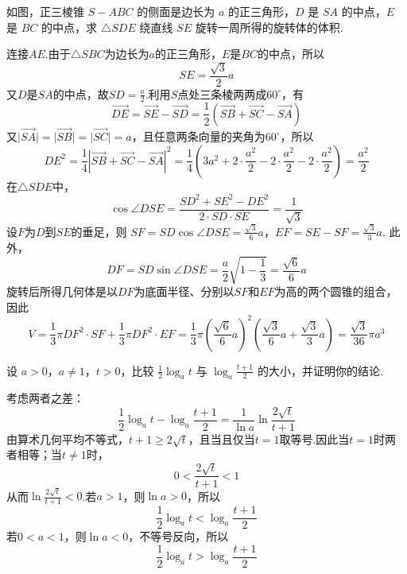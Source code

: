 \begin{problem}

如图，正三棱锥 \(S-ABC\) 的侧面是边长为 \(a\) 的正三角形，\(D\) 是 \(SA\) 的中点，\(E\) 是 \(BC\) 的中点，求 \(\triangle SDE\) 绕直线 \(SE\) 旋转一周所得的旋转体的体积.
\end{problem}

\begin{solution}
连接\(AE\).由于\(\triangle SBC\)为边长为\(a\)的正三角形，\(E\)是\(BC\)的中点，所以
\[
SE=\frac{\sqrt3}{2}a
\]
又\(D\)是\(SA\)的中点，故\(SD=\frac a2\).利用\(S\)点处三条棱两两成\(60^{\circ}\)，有
\[
\overrightarrow{DE}=\overrightarrow{SE}-\overrightarrow{SD}
=\frac12\left(\overrightarrow{SB}+\overrightarrow{SC}-\overrightarrow{SA}\right)
\]
又\(\lvert\overrightarrow{SA}\rvert=\lvert\overrightarrow{SB}\rvert=\lvert\overrightarrow{SC}\rvert=a\)，且任意两条向量的夹角为\(60^{\circ}\)，所以
\[
DE^2=\frac14\left\lvert\overrightarrow{SB}+\overrightarrow{SC}-\overrightarrow{SA}\right\rvert^2
=\frac14\left(3a^2+2\cdot\frac{a^2}{2}-2\cdot\frac{a^2}{2}-2\cdot\frac{a^2}{2}\right)
=\frac{a^2}{2}
\]
在\(\triangle SDE\)中，
\[
\cos\angle DSE
=\frac{SD^2+SE^2-DE^2}{2\cdot SD\cdot SE}
=\frac{1}{\sqrt3}
\]
设\(F\)为\(D\)到\(SE\)的垂足，则
\(SF=SD\cos\angle DSE=\frac{\sqrt3}{6}a\)，\(EF=SE-SF=\frac{\sqrt3}{3}a\).
此外，
\[
DF=SD\sin\angle DSE
=\frac a2\sqrt{1-\frac13}=\frac{\sqrt6}{6}a
\]
旋转后所得几何体是以\(DF\)为底面半径、分别以\(SF\)和\(EF\)为高的两个圆锥的组合，因此
\[
V=\frac13\pi DF^2\cdot SF+\frac13\pi DF^2\cdot EF
=\frac13\pi\left(\frac{\sqrt6}{6}a\right)^2
\left(\frac{\sqrt3}{6}a+\frac{\sqrt3}{3}a\right)
=\frac{\sqrt3}{36}\pi a^3
\]
\end{solution}

\begin{problem}

设 \(a > 0\)，\(a \neq 1\)，\(t > 0\)，比较 \(\frac{1}{2} \log_a t\) 与 \(\log_a \frac{t + 1}{2}\) 的大小，并证明你的结论.
\end{problem}

\begin{solution}
考虑两者之差：
\[
\frac12\log_a t-\log_a\frac{t+1}{2}
=\frac{1}{\ln a}\ln\frac{2\sqrt t}{t+1}
\]
由算术几何平均不等式，\(t+1\ge2\sqrt t\)，且当且仅当\(t=1\)取等号.因此当\(t=1\)时两者相等；当\(t\ne1\)时，
\[
0<\frac{2\sqrt t}{t+1}<1
\]
从而\(\ln\frac{2\sqrt t}{t+1}<0\).若\(a>1\)，则\(\ln a>0\)，所以
\[
\frac12\log_a t<\log_a\frac{t+1}{2}
\]
若\(0<a<1\)，则\(\ln a<0\)，不等号反向，所以
\[
\frac12\log_a t>\log_a\frac{t+1}{2}
\]
\end{solution}

